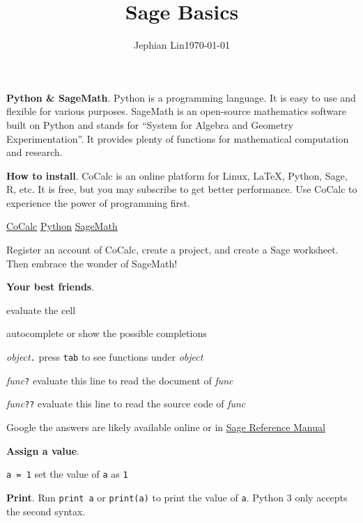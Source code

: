 \documentclass{article}
\title{Sage Basics}
\author{Jephian Lin\hspace{2cm}\today}
\date{\vspace{-1cm}}
\newcommand{\heading}[1]{\medskip\textbf{#1}.}
\newenvironment{lwdes}{\begin{description}[leftmargin=1.7cm,align=left,labelwidth=1.5cm]}{\end{description}}
\begin{document}
\maketitle

\large

\begin{multicols}{2}
\heading{Python \& SageMath}  Python is a programming language.  It is easy to use and flexible for various purposes.  SageMath is an open-source mathematics software built on Python and stands for ``System for Algebra and Geometry Experimentation''.  It provides plenty of functions for mathematical computation and research.

\heading{How to install}  CoCalc is an online platform for Linux, \LaTeX{}, Python, Sage, R, etc.  It is free, but you may subscribe to get better performance.  Use CoCalc to experience the power of programming first.  
\begin{center}
\href{https://cocalc.com/}{CoCalc}
\hfil
\href{https://www.python.org/}{Python}
\hfil
\href{http://www.sagemath.org/}{SageMath}
\end{center}
Register an account of CoCalc, create a project, and create a Sage worksheet.  Then embrace the wonder of SageMath!

\heading{Your best friends}
\begin{lwdes}
\item[\stackanchor{\keys{shift}}{+\keys{enter}}] evaluate the cell
\item[\keys{tab}] autocomplete or show the possible completions
\item[\textit{object}\texttt{.}] press \texttt{tab} to see functions under \textit{object}
\item[\textit{func}\texttt{?}] evaluate this line to read the document of \textit{func}
\item[\textit{func}\texttt{??}] evaluate this line to read the source code of \textit{func} 
\item[Google] the answers are likely available online or in \href{https://doc.sagemath.org/html/en/reference/}{Sage Reference Manual}
\end{lwdes}

\heading{Assign a value}
\begin{lwdes}
\item[\texttt{a = 1}] set the value of \texttt{a} as \texttt{1}
\end{lwdes}

\heading{Print}
Run \texttt{print a} or \texttt{print(a)} to print the value of \texttt{a}.  Python 3 only accepts the second syntax.
\columnbreak


\end{multicols}
\end{document}
